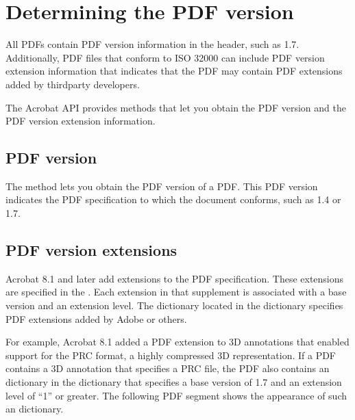 \documentclass[letterpaper,12pt,english,openany,oneside]{sphinxmanual}
\begin{document}
\section{Determining the PDF version}
\label{\detokenize{Plugins_Documents:determining-the-pdf-version}}
All PDFs contain PDF version information in the header, such as 1.7. Additionally, PDF files that conform to ISO 32000 can include PDF version extension information that indicates that the PDF may contain PDF extensions added by third\sphinxhyphen{}party developers.

The Acrobat API provides methods that let you obtain the PDF version and the PDF version extension information.


\subsection{PDF version}
\label{\detokenize{Plugins_Documents:pdf-version}}
The  method lets you obtain the PDF version of a PDF. This PDF version indicates the PDF specification to which the document conforms, such as 1.4 or 1.7.


\subsection{PDF version extensions}
\label{\detokenize{Plugins_Documents:pdf-version-extensions}}
Acrobat 8.1 and later add extensions to the PDF specification. These extensions are specified in the . Each extension in that supplement is associated with a base version and an extension level. The  dictionary located in the  dictionary specifies PDF extensions added by Adobe or others.

For example, Acrobat 8.1 added a PDF extension to 3D annotations that enabled support for the PRC format, a highly compressed 3D representation. If a PDF contains a 3D annotation that specifies a PRC file, the PDF also contains an  dictionary in the  dictionary that specifies a base version of 1.7 and an extension level of “1” or greater. The following PDF segment shows the appearance of such an  dictionary.

\begin{sphinxVerbatim}[commandchars=\\\{\}]
 
 
           
\end{sphinxVerbatim}
\end{document}
